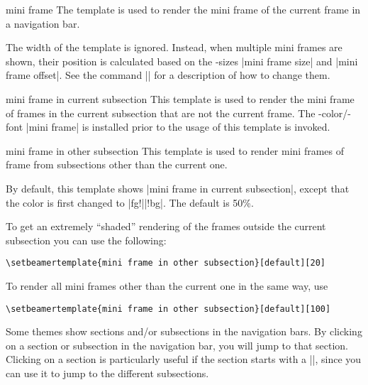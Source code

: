 \begin{element}{mini frame}\yes\yes\yes
  The template is used to render the mini frame of the current frame
  in a navigation bar.

  The width of the template is ignored. Instead, when multiple mini
  frames are shown, their position is calculated based on the
  \beamer-sizes |mini frame size| and |mini frame offset|. See the
  command |\setbeamersize| for a description of how to change them.
\end{element}

\begin{element}{mini frame in current subsection}\yes\no\no
  This template is used to render the mini frame of frames in the
  current subsection that are not the current frame. The
  \beamer-color/-font |mini frame| is installed prior to the usage of
  this template is invoked.
\end{element}

\begin{element}{mini frame in other subsection}\yes\no\no
  This template is used to render mini frames of frame from
  subsections other than the current one.
  \begin{templateoptions}
    By default, this template shows |mini frame in current subsection|, except that the color is first
    changed to |fg!||!bg|. The default
     is 50\%.

    \example To get an extremely ``shaded'' rendering of the frames
    outside the current subsection you can use the following:
\begin{verbatim}
\setbeamertemplate{mini frame in other subsection}[default][20]
\end{verbatim}

    \example To render all mini frames other than the current one in
    the same way, use
\begin{verbatim}
\setbeamertemplate{mini frame in other subsection}[default][100]
\end{verbatim}
  \end{templateoptions}
\end{element}



Some themes show sections and/or subsections in the navigation bars. 
By clicking on a section or subsection in the navigation bar, you will
jump to that section. Clicking on a section is particularly useful if
the section starts with a |\tableofcontents[currentsection]|, since you
can use it to jump to the different subsections.

